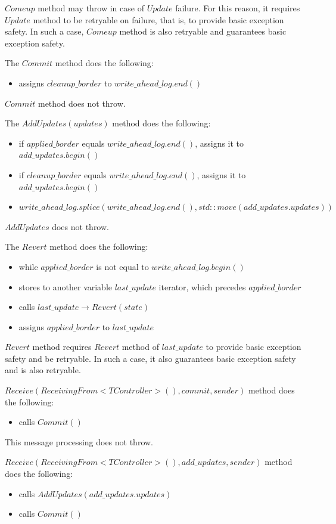 \documentclass{article}
\begin{document}
$Comeup$ method may throw in case of $Update$ failure. For this reason, it requires $Update$ method to be retryable on failure, that is, to provide basic exception safety. In such a case, $Comeup$ method is also retryable and guarantees basic exception safety.

The $Commit$ method does the following:
\begin{itemize}
	\item assigns $cleanup\_border$ to $write\_ahead\_log.end()$
\end{itemize}

$Commit$ method does not throw.

The $AddUpdates(updates)$ method does the following:
\begin{itemize}
	\item if $applied\_border$ equals $write\_ahead\_log.end()$, assigns it to $add\_updates.begin()$
	\item if $cleanup\_border$ equals $write\_ahead\_log.end()$, assigns it to $add\_updates.begin()$
	\item $write\_ahead\_log.splice(write\_ahead\_log.end(), std::move(add\_updates.updates))$
\end{itemize}

$AddUpdates$ does not throw.

The $Revert$ method does the following:
\begin{itemize}
	\item while $applied\_border$ is not equal to $write\_ahead\_log.begin()$
	\item stores to another variable $last\_update$ iterator, which precedes $applied\_border$
	\item calls $last\_update \rightarrow Revert(state)$
	\item assigns $applied\_border$ to $last\_update$
\end{itemize}

$Revert$ method requires $Revert$ method of $last\_update$ to provide basic exception safety and be retryable. In such a case, it also guarantees basic exception safety and is also retryable.

$Receive(ReceivingFrom<TController>(), commit, sender)$ method does the following:
\begin{itemize}
	\item calls $Commit()$
\end{itemize}

This message processing does not throw.

$Receive(ReceivingFrom<TController>(), add\_updates, sender)$ method does the following:
\begin{itemize}
	\item calls $AddUpdates(add\_updates.updates)$
	\item calls $Commit()$
\end{itemize}
\end{document}
